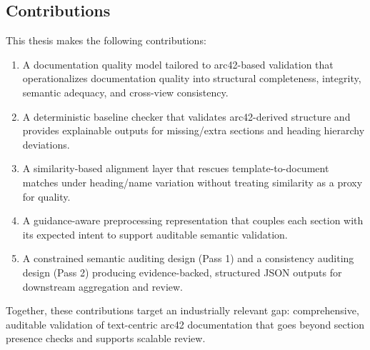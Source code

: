 \subsection{Contributions}
This thesis makes the following contributions:
\begin{enumerate}
    \item A documentation quality model tailored to arc42-based validation that operationalizes documentation quality into structural completeness, integrity, semantic adequacy, and cross-view consistency.
    \item A deterministic baseline checker that validates arc42-derived structure and provides explainable outputs for missing/extra sections and heading hierarchy deviations.
    \item A similarity-based alignment layer that rescues template-to-document matches under heading/name variation without treating similarity as a proxy for quality.
    \item A guidance-aware preprocessing representation that couples each section with its expected intent to support auditable semantic validation.
    \item A constrained semantic auditing design (Pass 1) and a consistency auditing design (Pass 2) producing evidence-backed, structured JSON outputs for downstream aggregation and review.
\end{enumerate}

Together, these contributions target an industrially relevant gap: comprehensive, auditable validation of text-centric arc42 documentation that goes beyond section presence checks and supports scalable review.

